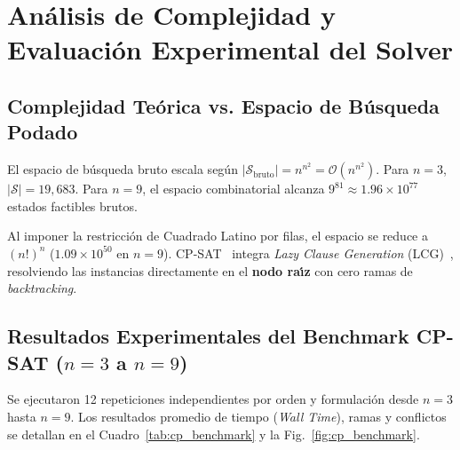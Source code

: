 \documentclass[conference]{IEEEtran}
\begin{document}
\section{An\'alisis de Complejidad y Evaluaci\'on Experimental del Solver}
\label{sec:complexity_and_experiments}

\subsection{Complejidad Te\'orica vs. Espacio de B\'usqueda Podado}
El espacio de b\'usqueda bruto escala seg\'un $|\mathcal{S}_{\text{bruto}}| = n^{n^2} = \mathcal{O}(n^{n^2})$. Para $n=3$, $|\mathcal{S}| = 19{,}683$. Para $n=9$, el espacio combinatorial alcanza $9^{81} \approx 1.96 \times 10^{77}$ estados factibles brutos.

Al imponer la restricci\'on de Cuadrado Latino por filas, el espacio se reduce a $(n!)^n$ ($1.09 \times 10^{50}$ en $n=9$). CP-SAT~\cite{perron2023cpsat, perron2024ortools} integra \textit{Lazy Clause Generation} (LCG)~\cite{ohrimenko2009lazy}, resolviendo las instancias directamente en el \textbf{nodo ra\'{\i}z} con cero ramas de \textit{backtracking}.

\subsection{Resultados Experimentales del Benchmark CP-SAT \texorpdfstring{($n=3$ a $n=9$)}{(n=3 a n=9)}}
Se ejecutaron 12 repeticiones independientes por orden y formulaci\'on desde $n=3$ hasta $n=9$. Los resultados promedio de tiempo (\textit{Wall Time}), ramas y conflictos se detallan en el Cuadro~\ref{tab:cp_benchmark} y la Fig.~\ref{fig:cp_benchmark}.
\end{document}
